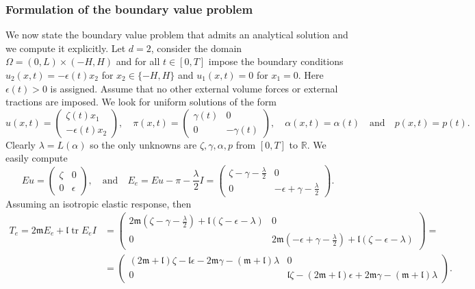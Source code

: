 \documentclass[a4paper,10pt,oneside]{amsbook}
\numberwithin{section}{chapter}
\numberwithin{equation}{chapter}
\theoremstyle{definition}
\DeclareMathOperator{\tr}{tr}
\begin{document}
\subsubsection*{Formulation of the boundary value problem} We now state the boundary value problem that admits an analytical solution and we compute it explicitly. Let $d=2$, consider the domain $\Omega=(0,L)\times(-H,H)$ and for all $t\in[0,T]$ impose the boundary conditions $u_2(x,t)=-\epsilon(t)x_2$ for $x_2\in\{-H,H\}$ and $u_1(x,t)=0$ for $x_1=0$. Here $\epsilon(t)>0$ is assigned. Assume that no other external volume forces or external tractions are imposed. We look for uniform solutions of the form
\[
u(x,t)=\begin{pmatrix}
\zeta(t)x_1 \\
-\epsilon(t)x_2
\end{pmatrix},\quad\pi(x,t)=\begin{pmatrix}
\gamma(t) & 0 \\
0 & -\gamma(t)
\end{pmatrix},\quad\alpha(x,t)=\alpha(t)\quad\text{and}\quad p(x,t)=p(t).
\]
Clearly $\lambda=L(\alpha)$ so the only unknowns are $\zeta,\gamma,\alpha,p$ from $[0,T]$ to $\mathbb{R}$. We easily compute
\[
Eu=\begin{pmatrix}
\zeta & 0 \\
0 & \epsilon
\end{pmatrix},
\quad\text{and}\quad
E_e=Eu-\pi-\frac{\lambda}{2}I=\begin{pmatrix}
\zeta-\gamma-\frac{\lambda}{2} & 0 \\
0 & -\epsilon+\gamma-\frac{\lambda}{2}
\end{pmatrix}.
\]
Assuming an isotropic elastic response, then
\[
\begin{split}
T_e=2\mathfrak{m} E_e+\mathfrak{l}\tr E_e I&=
\begin{pmatrix}
2\mathfrak{m}\left(\zeta-\gamma-\frac{\lambda}{2}\right)+\mathfrak{l}(\zeta-\epsilon-\lambda) & 0 \\
0 & 2\mathfrak{m}\left(-\epsilon+\gamma-\frac{\lambda}{2}\right)+\mathfrak{l}(\zeta-\epsilon-\lambda)
\end{pmatrix}=\\
&=\begin{pmatrix}
(2\mathfrak{m}+\mathfrak{l})\zeta-\mathfrak{l}\epsilon-2\mathfrak{m}\gamma-(\mathfrak{m}+\mathfrak{l})\lambda & 0 \\
0 & \mathfrak{l}\zeta-(2\mathfrak{m}+\mathfrak{l})\epsilon+2\mathfrak{m}\gamma-(\mathfrak{m}+\mathfrak{l})\lambda
\end{pmatrix}.
\end{split}
\]
\end{document}
